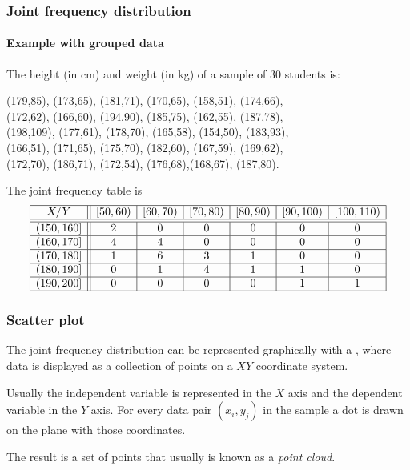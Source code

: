 \begin{frame}
\frametitle{Joint frequency distribution}
\framesubtitle{Example with grouped data}
The height (in cm) and weight (in kg) of a sample of 30 students is:
\begin{center}
(179,85), (173,65), (181,71), (170,65), (158,51), (174,66),\\
(172,62), (166,60), (194,90), (185,75), (162,55), (187,78),\\
(198,109), (177,61), (178,70), (165,58), (154,50), (183,93),\\
(166,51), (171,65), (175,70), (182,60), (167,59), (169,62),\\
(172,70), (186,71), (172,54), (176,68),(168,67), (187,80).
\end{center}

The joint frequency table is 
\[
\begin{array}{|c||c|c|c|c|c|c|}
\hline
  X/Y & [50,60) & [60,70) & [70,80) & [80,90) & [90,100) & [100,110) \\
  \hline\hline
  (150,160] & 2 & 0 & 0 & 0 & 0 & 0 \\
  \hline
  (160,170] & 4 & 4 & 0 & 0 & 0 & 0 \\
  \hline
  (170,180] & 1 & 6 & 3 & 1 & 0 & 0 \\
  \hline
  (180,190] & 0 & 1 & 4 & 1 & 1 & 0 \\
  \hline
  (190,200] & 0 & 0 & 0 & 0 & 1 & 1 \\
  \hline
\end{array}
\]
\end{frame}


\begin{frame}
\frametitle{Scatter plot}
The joint frequency distribution can be represented graphically with a , where data is displayed as a collection of points on a $XY$ coordinate system.

Usually the independent variable is represented in the $X$ axis and the dependent variable in the $Y$ axis.
For every data pair $(x_i,y_j)$ in the sample a dot is drawn on the plane with those coordinates.  
\begin{center}
\resizebox{0.4\textwidth}{!}{}
\end{center}

The result is a set of points that usually is known as a \emph{point cloud}.


\end{frame}



